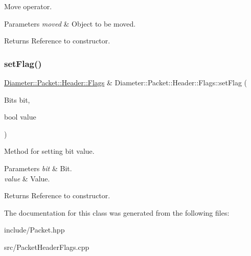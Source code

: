 Move operator. 


\begin{DoxyParams}{Parameters}
{\em moved} & Object to be moved. \\
\hline
\end{DoxyParams}
\begin{DoxyReturn}{Returns}
Reference to constructor. 
\end{DoxyReturn}
\mbox{\label{classDiameter_1_1Packet_1_1Header_1_1Flags_af50380856a40d98f7c82bc55fa4b61a6}} 
\subsubsection{\texorpdfstring{set\+Flag()}{setFlag()}}
{\footnotesize\ttfamily \hyperlink{classDiameter_1_1Packet_1_1Header_1_1Flags}{Diameter\+::\+Packet\+::\+Header\+::\+Flags} \& Diameter\+::\+Packet\+::\+Header\+::\+Flags\+::set\+Flag (\begin{DoxyParamCaption}\item[{Bits}]{bit,  }\item[{bool}]{value }\end{DoxyParamCaption})}



Method for setting bit value. 


\begin{DoxyParams}{Parameters}
{\em bit} & Bit. \\
\hline
{\em value} & Value. \\
\hline
\end{DoxyParams}
\begin{DoxyReturn}{Returns}
Reference to constructor. 
\end{DoxyReturn}


The documentation for this class was generated from the following files\+:\begin{DoxyCompactItemize}
\item 
include/Packet.\+hpp\item 
src/Packet\+Header\+Flags.\+cpp\end{DoxyCompactItemize}
